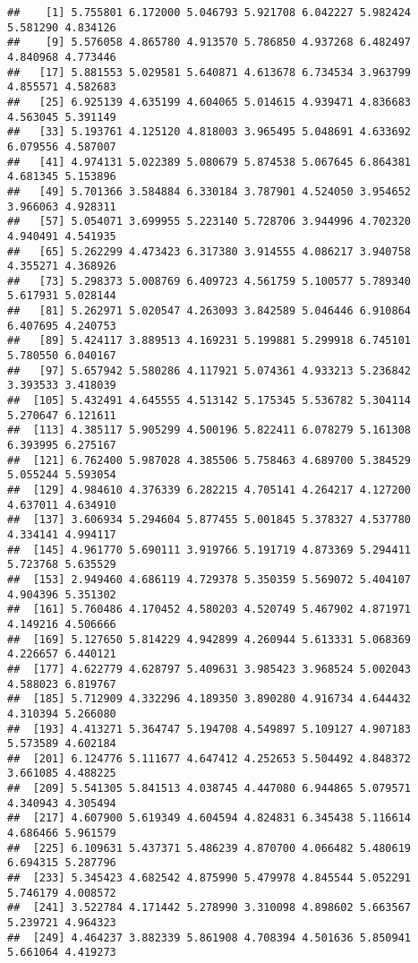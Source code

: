 \documentclass[
]{article}
\begin{document}
\begin{verbatim}
##    [1] 5.755801 6.172000 5.046793 5.921708 6.042227 5.982424 5.581290 4.834126
##    [9] 5.576058 4.865780 4.913570 5.786850 4.937268 6.482497 4.840968 4.773446
##   [17] 5.881553 5.029581 5.640871 4.613678 6.734534 3.963799 4.855571 4.582683
##   [25] 6.925139 4.635199 4.604065 5.014615 4.939471 4.836683 4.563045 5.391149
##   [33] 5.193761 4.125120 4.818003 3.965495 5.048691 4.633692 6.079556 4.587007
##   [41] 4.974131 5.022389 5.080679 5.874538 5.067645 6.864381 4.681345 5.153896
##   [49] 5.701366 3.584884 6.330184 3.787901 4.524050 3.954652 3.966063 4.928311
##   [57] 5.054071 3.699955 5.223140 5.728706 3.944996 4.702320 4.940491 4.541935
##   [65] 5.262299 4.473423 6.317380 3.914555 4.086217 3.940758 4.355271 4.368926
##   [73] 5.298373 5.008769 6.409723 4.561759 5.100577 5.789340 5.617931 5.028144
##   [81] 5.262971 5.020547 4.263093 3.842589 5.046446 6.910864 6.407695 4.240753
##   [89] 5.424117 3.889513 4.169231 5.199881 5.299918 6.745101 5.780550 6.040167
##   [97] 5.657942 5.580286 4.117921 5.074361 4.933213 5.236842 3.393533 3.418039
##  [105] 5.432491 4.645555 4.513142 5.175345 5.536782 5.304114 5.270647 6.121611
##  [113] 4.385117 5.905299 4.500196 5.822411 6.078279 5.161308 6.393995 6.275167
##  [121] 6.762400 5.987028 4.385506 5.758463 4.689700 5.384529 5.055244 5.593054
##  [129] 4.984610 4.376339 6.282215 4.705141 4.264217 4.127200 4.637011 4.634910
##  [137] 3.606934 5.294604 5.877455 5.001845 5.378327 4.537780 4.334141 4.994117
##  [145] 4.961770 5.690111 3.919766 5.191719 4.873369 5.294411 5.723768 5.635529
##  [153] 2.949460 4.686119 4.729378 5.350359 5.569072 5.404107 4.904396 5.351302
##  [161] 5.760486 4.170452 4.580203 4.520749 5.467902 4.871971 4.149216 4.506666
##  [169] 5.127650 5.814229 4.942899 4.260944 5.613331 5.068369 4.226657 6.440121
##  [177] 4.622779 4.628797 5.409631 3.985423 3.968524 5.002043 4.588023 6.819767
##  [185] 5.712909 4.332296 4.189350 3.890280 4.916734 4.644432 4.310394 5.266080
##  [193] 4.413271 5.364747 5.194708 4.549897 5.109127 4.907183 5.573589 4.602184
##  [201] 6.124776 5.111677 4.647412 4.252653 5.504492 4.848372 3.661085 4.488225
##  [209] 5.541305 5.841513 4.038745 4.447080 6.944865 5.079571 4.340943 4.305494
##  [217] 4.607900 5.619349 4.604594 4.824831 6.345438 5.116614 4.686466 5.961579
##  [225] 6.109631 5.437371 5.486239 4.870700 4.066482 5.480619 6.694315 5.287796
##  [233] 5.345423 4.682542 4.875990 5.479978 4.845544 5.052291 5.746179 4.008572
##  [241] 3.522784 4.171442 5.278990 3.310098 4.898602 5.663567 5.239721 4.964323
##  [249] 4.464237 3.882339 5.861908 4.708394 4.501636 5.850941 5.661064 4.419273

\end{verbatim}
\end{document}
